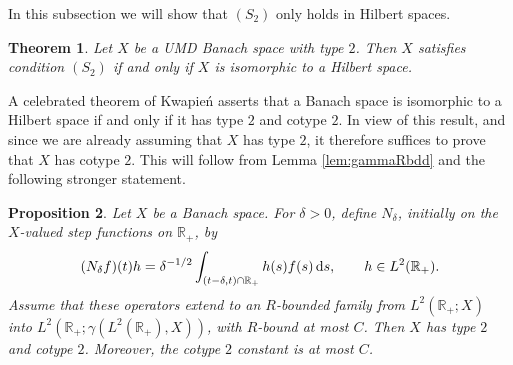 \documentclass{amsart}
\theoremstyle{plain}
\newtheorem{theorem}{Theorem}[section]
\theoremstyle{remark}
\theoremstyle{plain}
\newtheorem{proposition}[theorem]{Proposition}
\numberwithin{equation}{section}
\newcommand{\R}{\mathbb R}
\newcommand{\1}{\mathbf 1}
\newcommand{\dd}{\,{\rm d}}
\begin{document}
In this subsection we will show that $(S_2)$ only holds in Hilbert spaces.
\begin{theorem}\label{thm:HScharacS2}
Let $X$ be a UMD Banach space with type $2$. Then $X$ satisfies condition $(S_2)$ if and only if $X$ is isomorphic to a Hilbert space.
\end{theorem}

A celebrated theorem of Kwapie\'n \cite[Theorem 7.3.1]{HNVW2} asserts that a Banach space is isomorphic to a Hilbert space if and only if it has type $2$ and cotype $2$. In view of this result, and since we are already assuming that $X$ has type $2$, it therefore suffices to prove that $X$ has cotype $2$. This will follow from Lemma  \ref{lem:gammaRbdd} and the following stronger statement.

\begin{proposition}\label{prop:Ndelta}
Let $X$ be a Banach space. For $\delta>0$, define $N_\delta$, initially on the $X$-valued step functions on $\R_+$, by
\[
        (N_\delta f)(t)h
        =
        \delta^{-1/2}
        \int_{(t-\delta,t)\cap\R_+}h(s)f(s)\dd s,
        \qquad h\in L^2(\R_+).
\]
Assume that these operators extend to an $R$-bounded family from $L^2(\R_+;X)$ into \(L^2(\R_+;\gamma(L^2(\R_+),X))\), with $R$-bound at most $C$. Then $X$ has type $2$ and cotype $2$. Moreover, the cotype $2$ constant is at most $C$.
\end{proposition}
\end{document}
